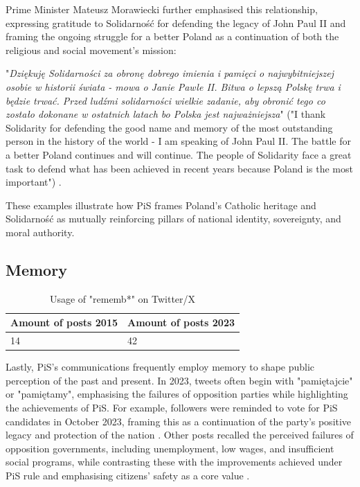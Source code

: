 Prime Minister Mateusz Morawiecki further emphasised this relationship, expressing gratitude to Solidarność for defending the legacy of John Paul II and framing the ongoing struggle for a better Poland as a continuation of both the religious and social movement’s mission:

\begin{displayquote}
"\textit{Dziękuję Solidarności za obronę dobrego imienia i pamięci o najwybitniejszej osobie w historii świata - mowa o Janie Pawle II. Bitwa o lepszą Polskę trwa i będzie trwać. Przed ludźmi solidarności wielkie zadanie, aby obronić tego co zostało dokonane w ostatnich latach bo Polska jest najważniejsza}" ("I thank Solidarity for defending the good name and memory of the most outstanding person in the history of the world - I am speaking of John Paul II. The battle for a better Poland continues and will continue. The people of Solidarity face a great task to defend what has been achieved in recent years because Poland is the most important") \citep{pisorgpl2023o}.
\end{displayquote}

These examples illustrate how PiS frames Poland's Catholic heritage and Solidarność as mutually reinforcing pillars of national identity, sovereignty, and moral authority.

\subsection{Memory}

\begin{table}[H]
    \centering
    \begin{tabular}{p{4cm}p{4cm}}
        \toprule
        \textbf{Amount of posts 2015}  & \textbf{Amount of posts 2023} \\ \midrule
        14 & 42  \\ \bottomrule
    \end{tabular}
    \caption{Usage of "rememb*" on Twitter/X \citep{rybicki_2025_16933320}}
    \label{tab:phrases-comp-4-2015-2023}
\end{table}

Lastly, PiS's communications frequently employ memory to shape public perception of the past and present. In 2023, tweets often begin with "pamiętajcie" or "pamiętamy", emphasising the failures of opposition parties while highlighting the achievements of PiS. For example, followers were reminded to vote for PiS candidates in October 2023, framing this as a continuation of the party's positive legacy and protection of the nation \citep{pisorgpl2023p}. Other posts recalled the perceived failures of opposition governments, including unemployment, low wages, and insufficient social programs, while contrasting these with the improvements achieved under PiS rule and emphasising citizens' safety as a core value \citep{pisorgpl2023q}.


